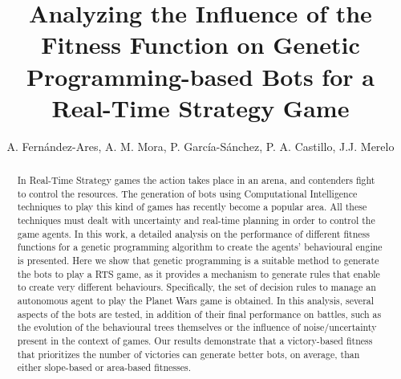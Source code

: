 \documentclass[preprint]{elsarticle}
\begin{document}
\begin{frontmatter}


\title{Analyzing the Influence of the Fitness Function on Genetic Programming-based Bots for a Real-Time Strategy Game}


\author{A. Fern{\'a}ndez-Ares, A. M. Mora, P. Garc{\'i}a-S{\'a}nchez, P. A. Castillo, J.J. Merelo}
\address{Department of Computer Architecture and Technlogy\\ and CITIC. University of Granada, Spain}


%
%
\begin{abstract}
In Real-Time Strategy games the action takes place in an arena, and contenders fight to control the resources.
The generation of bots using Computational Intelligence techniques to play this kind of games has recently become a popular area.
All these techniques must dealt with uncertainty and real-time planning in order to control the game agents.
In this work, a detailed analysis on the performance of different fitness functions for a genetic programming algorithm to create the agents' behavioural engine is presented.
Here we show that genetic programming is a suitable method to generate the bots to play a RTS game, as it provides a mechanism to generate rules that enable to create very different behaviours.
Specifically, the set of decision rules to manage an autonomous agent to play the Planet Wars game is obtained.
In this analysis, several aspects of the bots are tested, in addition of their final performance on battles, such as the evolution of the behavioural trees themselves or the influence of noise/uncertainty present in the context of games.
Our results demonstrate that a victory-based fitness that prioritizes the number of victories can generate better bots, on average, than either slope-based or area-based fitnesses. 
\end{abstract}


\end{frontmatter}
\end{document}
